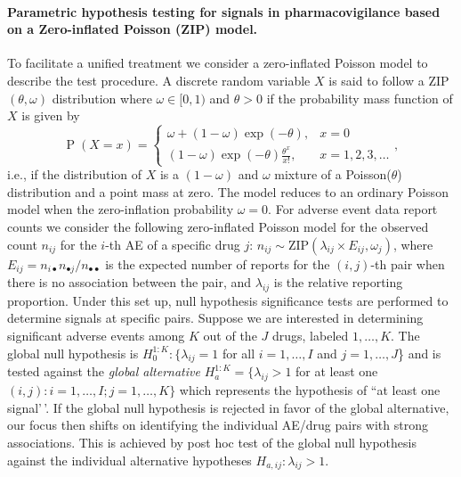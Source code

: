 \hypertarget{parametric-hypothesis-testing-for-signals-in-pharmacovigilance-based-on-a-zero-inflated-poisson-zip-model.}{%
\paragraph{Parametric hypothesis testing for signals in pharmacovigilance based on a Zero-inflated Poisson (ZIP) model.}\label{parametric-hypothesis-testing-for-signals-in-pharmacovigilance-based-on-a-zero-inflated-poisson-zip-model.}}

To facilitate a unified treatment we consider a zero-inflated Poisson model to describe the test procedure. A discrete random variable \(X\) is said to follow a ZIP\((\theta, \omega)\) distribution where \(\omega \in [0, 1)\) and \(\theta > 0\) if the probability mass function of \(X\) is given by \[
\operatorname{P}(X = x) = \begin{cases}
\omega +  (1 - \omega) \exp(-\theta), & x = 0 \\
(1 - \omega) \exp(-\theta) \frac{\theta^x}{x!}, & x = 1, 2, 3, \dots
\end{cases},
\] i.e., if the distribution of \(X\) is a \((1-\omega)\) and \(\omega\) mixture of a Poisson(\(\theta\)) distribution and a point mass at zero. The model reduces to an ordinary Poisson model when the zero-inflation probability \(\omega = 0\). For adverse event data report counts we consider the following zero-inflated Poisson model for the observed count \(n_{i j}\) for the \(i\)-th AE of a specific drug \(j\): \(n_{i j} \sim \text{ZIP}(\lambda_{i j} \times E_{i j}, \omega_{j})\), where \(E_{i j} = n_{i \bullet} n_{\bullet j}/n_{\bullet \bullet }\) is the expected number of reports for the \((i, j)\)-th pair when there is no association between the pair, and \(\lambda_{i j}\) is the relative reporting proportion. Under this set up, null hypothesis significance tests are performed to determine signals at specific pairs. Suppose we are interested in determining significant adverse events among \(K\) out of the \(J\) drugs, labeled \(1, \dots, K\). The global null hypothesis is \(H_0^{1:K}: \{\lambda_{i j} = 1\) for all \(i = 1, \dots, I\) and \(j = 1, \dots, J\)\} and is tested against the \emph{global alternative} \(H_a^{1:K} = \{ \lambda_{i j} > 1\) for at least one \((i, j): i = 1, \dots, I; j = 1, \dots, K\}\) which represents the hypothesis of ``at least one signal'\,'. If the global null hypothesis is rejected in favor of the global alternative, our focus then shifts on identifying the individual AE/drug pairs with strong associations. This is achieved by post hoc test of the global null hypothesis against the individual alternative hypotheses \(H_{a, i j}: \lambda_{i j} > 1\).

